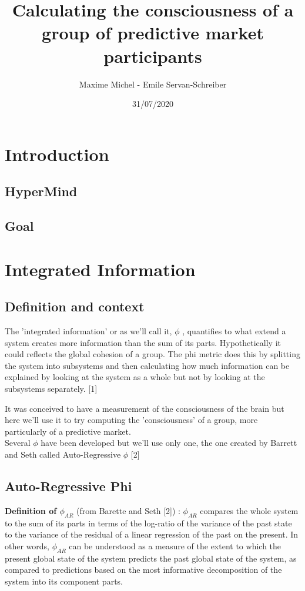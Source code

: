 \documentclass{report}
\title{Calculating the consciousness of a group of predictive market participants}
\author{Maxime Michel - Emile Servan-Schreiber}
\date{31/07/2020}
\begin{document}
 
\maketitle


\chapter{Introduction}
\section{HyperMind}
\section{Goal}



\chapter{Integrated Information}
\section{Definition and context}

The 'integrated information' or as we'll call it, $\phi $ , quantifies to what extend a system creates more information than the sum of its parts. Hypothetically it could reflects the global cohesion of a group. The phi metric does this by splitting the system into subsystems and then calculating how much information can be explained by looking at the system as a whole but not by looking at the subsystems separately. [1]

It was conceived to have a measurement of the consciousness of the brain but here we'll use it to try computing the 'consciousness' of a group, more particularly of a predictive market.\\

Several $\phi $ have been developed but we'll use only one, the one created by Barrett and Seth called Auto-Regressive $\phi $ [2]

\section{Auto-Regressive Phi}

\textbf{Definition of $ \phi_{AR} $} (from Barette and Seth [2]) : $ \phi_{AR} $ compares the whole system to the sum of its parts in	terms of the log-ratio of the variance of the past state to the variance of the residual of a linear regression of the past on the present. In other words, $ \phi_{AR} $ can be understood as a measure of the extent to which the present global state of the system predicts the past global state of the system, as compared to predictions based on the most informative decomposition of the system into its component parts.\\
\\
\end{document}
